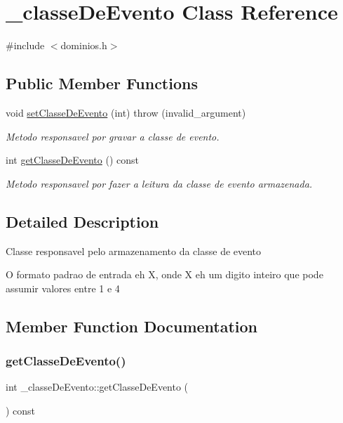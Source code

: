 \hypertarget{class__classe_de_evento}{}\section{\+\_\+classe\+De\+Evento Class Reference}
\label{class__classe_de_evento}


{\ttfamily \#include $<$dominios.\+h$>$}

\subsection*{Public Member Functions}
\begin{DoxyCompactItemize}
\item 
void \mbox{\hyperlink{class__classe_de_evento_aefe318e835e46b4a2c05c12563667f04}{set\+Classe\+De\+Evento}} (int)  throw (invalid\+\_\+argument)
\begin{DoxyCompactList}\small\item\em Metodo responsavel por gravar a classe de evento. \end{DoxyCompactList}\item 
int \mbox{\hyperlink{class__classe_de_evento_a70020741831064cc5863701844746ed5}{get\+Classe\+De\+Evento}} () const
\begin{DoxyCompactList}\small\item\em Metodo responsavel por fazer a leitura da classe de evento armazenada. \end{DoxyCompactList}\end{DoxyCompactItemize}


\subsection{Detailed Description}
Classe responsavel pelo armazenamento da classe de evento

O formato padrao de entrada eh X, onde X eh um digito inteiro que pode assumir valores entre 1 e 4 

\subsection{Member Function Documentation}
\mbox{\label{class__classe_de_evento_a70020741831064cc5863701844746ed5}} 
\subsubsection{\texorpdfstring{getClasseDeEvento()}{getClasseDeEvento()}}
{\footnotesize\ttfamily int \+\_\+classe\+De\+Evento\+::get\+Classe\+De\+Evento (\begin{DoxyParamCaption}{ }\end{DoxyParamCaption}) const\hspace{0.3cm}{\ttfamily [inline]}}




